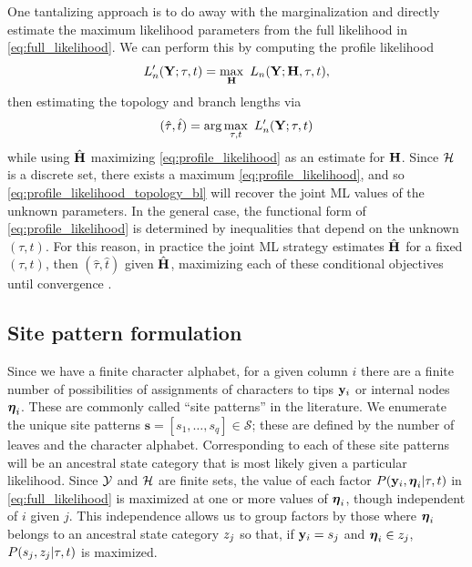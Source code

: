 \documentclass[a4paper]{article}
\begin{document}
One tantalizing approach is to do away with the marginalization and directly estimate the maximum likelihood parameters from the full likelihood in \eqref{eq:full_likelihood}.
We can perform this by computing the profile likelihood
\begin{equation}
\label{eq:profile_likelihood}
L_n'(\fullAlignment;\tau, t) = \max_{\fullAncestralStates} \ L_n(\fullAlignment;\fullAncestralStates, \tau, t),
\end{equation}
then estimating the topology and branch lengths via
\begin{equation}
\label{eq:profile_likelihood_topology_bl}
(\hat{\tau}, \hat{t}) = \arg\max_{\tau, t} \ L_n'(\mathbf{Y};\tau, t)
\end{equation}
while using $\hat{\mathbf{H}}$ maximizing \eqref{eq:profile_likelihood} as an estimate for $\mathbf{H}$.
Since $\mathcal{H}$ is a discrete set, there exists a maximum \eqref{eq:profile_likelihood}, and so \eqref{eq:profile_likelihood_topology_bl} will recover the joint ML values of the unknown parameters.
In the general case, the functional form of \eqref{eq:profile_likelihood} is determined by inequalities that depend on the unknown $(\tau,t)$.
For this reason, in practice the joint ML strategy estimates $\hat{\mathbf{H}}$ for a fixed $(\tau,t)$, then $(\hat{\tau},\hat{t})$ given $\hat{\mathbf{H}}$, maximizing each of these conditional objectives until convergence \cite{Neher2017}.

\subsection{Site pattern formulation}

Since we have a finite character alphabet, for a given column $i$ there are a finite number of possibilities of assignments of characters to tips $\mathbf{y}_i$ or internal nodes $\boldsymbol\eta_i$.
These are commonly called ``site patterns'' in the literature.
We enumerate the unique site patterns $\mathbf{s}=[s_1,\ldots,s_q]\in\mathcal{S}$; these are defined by the number of leaves and the character alphabet.
Corresponding to each of these site patterns will be an ancestral state category that is most likely given a particular likelihood.
Since $\mathcal{Y}$ and $\mathcal{H}$ are finite sets, the value of each factor $P(\mathbf{y}_i, \boldsymbol\eta_i | \tau, t)$ in \eqref{eq:full_likelihood} is maximized at one or more values of $\boldsymbol\eta_i$, though independent of $i$ given $j$.
This independence allows us to group factors by those where $\boldsymbol\eta_i$ belongs to an ancestral state category $z_j$ so that, if $\mathbf{y}_i=s_j$ and $\boldsymbol\eta_i\in z_j$, $P(s_j, z_j | \tau, t)$ is maximized.
\end{document}
